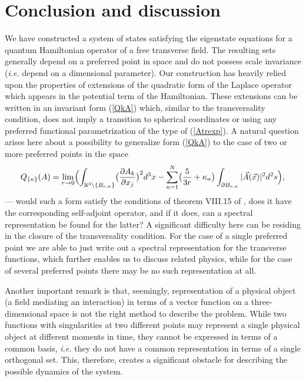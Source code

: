 \documentclass[12pt]{article}
\newcommand{\RR}{\mathbb{R}}
\begin{document}
\section{Conclusion and discussion}
	We have constructed a system of states 
	satisfying the eigenstate equations for a quantum Hamiltonian operator
	of a free transverse field.
	The resulting sets generally depend on a preferred point in space and
	do not possess scale invariance ({\it i.e.} depend on a dimensional parameter).
	Our construction has heavily relied upon the properties of extensions
	of the quadratic form of the Laplace operator which appears in the potential term
	of the Hamiltonian.
	These extensions can be written in an invariant form
(\ref{QkA})
	which, similar to the transversality condition, does not imply a transition
	to spherical coordinates or using any preferred functional parametrization
        of the type of
(\ref{Atrexp}).
	A natural question arises here about a possibility to generalize form
(\ref{QkA})
	to the case of two or more preferred points in the space
\begin{equation*}
        Q_{\{\kappa\}}(A) = \lim_{r\to 0}\Bigl(
    \int_{\RR^{3}\setminus \{B_{r,n}\}}
        \bigl(\frac{\partial A_{k}}{\partial x_{j}}\bigr)^{2} d^{3} x -
    \sum_{n=1}^{N}\bigl(\frac{5}{3r}	+ \kappa_{n}\bigr)
	\int_{\partial B_{r,n}} |\vec{A}(\vec{x})|^{2} d^{2} s \Bigr) ,
\end{equation*}
	--- would such a form satisfy the conditions of theorem VIII.15 of
\cite{RS1},
	does it have the corresponding self-adjoint operator, and if it does,
	can a spectral representation be found for the latter?
	A significant difficulty here can be residing in the closure of the
	transversality condition.
	For the case of a single preferred point we are able to just
	write out a spectral representation for the transverse functions,
	which further enables us to discuss related physics,
	while for the case of several preferred points there may be no
	such representation at all.

	Another important remark is that, seemingly, representation
	of a physical object (a field mediating an interaction) in terms of a vector function
	on a three-dimensional space is not the right method to describe the problem.
	While two functions with singularities at two different points may represent
	a single physical object at different moments in time, they
	cannot be expressed in terms of a common basis,
	{\it i.e.} they do not have a common representation in terms of a single
	orthogonal set.
	This, therefore, creates a significant obstacle for describing the possible
	dynamics of the system.
\end{document}
